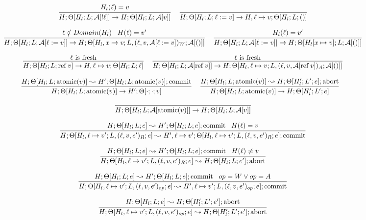 \documentclass[9pt]{article}
\newcommand{\aeval}[1]{\mathcal{A}[#1]}
\newcommand{\loc}[0]{\ell}
\newcommand{\atomic}[1]{\text{atomic}(#1)}
\newcommand{\alloc}[1]{\text{ref} \; #1}
\newcommand{\commit}[0]{\text{commit}}
\newcommand{\abort}[0]{\text{abort}}
\begin{document}
\[
\infer[]{H; \Theta[H_l; L; \aeval{!\loc}] \rightarrow H; \Theta[H_l; L; \aeval{v}]}{H_l(\loc) = v } \;\;\;
\infer[]{H; \Theta[H_l; L; \loc := v] \rightarrow H, \loc \mapsto v; \Theta[H_l; L; ()]}{}
\]

\[
\infer[]{H; \Theta[H_l; L; \aeval{\loc := v}] \rightarrow H; \Theta[H_l, x\mapsto v; L, (\loc, v, \aeval{\loc := v})_W; \aeval{()}]}{\loc \notin Domain(H_l) \;\;\; H(\loc) = v'} \;\;\;
\infer[]{H; \Theta[H_l; L; \aeval{\loc := v}] \rightarrow H; \Theta[H_l[x\mapsto v]; L; \aeval{()}]}{H_l(\loc) = v'} 
\]

\[
\infer[]{H; \Theta[H_l; L; \alloc{v}] \rightarrow H, \loc \mapsto v; \Theta[H_l; L; \loc]}{\loc \text{ is fresh}} \;\;\;
\infer[]{H; \Theta[H_l; L; \aeval{\alloc{v}}] \rightarrow H; \Theta[H_l, \loc \mapsto v; L, (\loc, v, \aeval{\alloc{v}})_A;  \aeval{()}]}{\loc \text{ is fresh}}
\]

\[
\infer[]{H; \Theta[H_l; L; \atomic{v}] \rightarrow H'; \Theta[\cdot;\cdot; v]}{H; \Theta[H_l; L; \atomic{v}] \leadsto H'; \Theta[H_l; L; \atomic{v}]; \commit} \;\;\;
\infer[]{H; \Theta[H_l; L; \atomic{v}] \rightarrow H; \Theta[H_l'; L'; e]}{H; \Theta[H_l; L; \atomic{v}] \leadsto H; \Theta[H_l'; L'; e]; \abort} \;\;\;
\]

\[
\infer[]{H; \Theta[H_l; L; \aeval{\atomic{v}}] \rightarrow H; \Theta[H_l; L; \aeval{v}]}{}
\]

\boxed{H; \Theta[H_l; L; e] \leadsto H', \Theta[H_l'; L'; e']; (\abort | \commit)}

\[
\infer[]{H; \Theta[H_l, \loc \mapsto v'; L, (\loc,v,e')_R; e] \leadsto H', \loc \mapsto v'; \Theta[H_l, \loc \mapsto v'; L, (\loc, v, e')_R;e]; \commit}{H; \Theta[H_l; L; e] \leadsto H'; \Theta[H_l; L; e]; \commit \;\;\; H(\loc) = v}
\]

\[
\infer[]{H; \Theta[H_l, \loc \mapsto v'; L, (\loc,v,e')_R; e] \leadsto H; \Theta[H_l; L; e']; \abort}{H; \Theta[H_l; L; e] \leadsto H'; \Theta[H_l; L; e]; \commit \;\;\; H(\loc) \not= v} 
\]

\[
\infer[]{H; \Theta[H_l, \loc \mapsto v'; L, (\loc,v,e')_{op}; e] \leadsto H', \loc \mapsto v'; L, (\loc,v,e')_{op}; e]; \commit}{H; \Theta[H_l; L; e] \leadsto H'; \Theta[H_l; L; e]; \commit \;\;\; op = W \lor op = A}
\]

\[
\infer[]{H; \Theta[H_l, \loc \mapsto v'; L, (\loc,v,e')_{op}; e] \leadsto H; \Theta[H_l'; L'; e']; \abort}{H; \Theta[H_l; L; e] \leadsto H; \Theta[H_l'; L'; e']; \abort} 
\]
\end{document}
